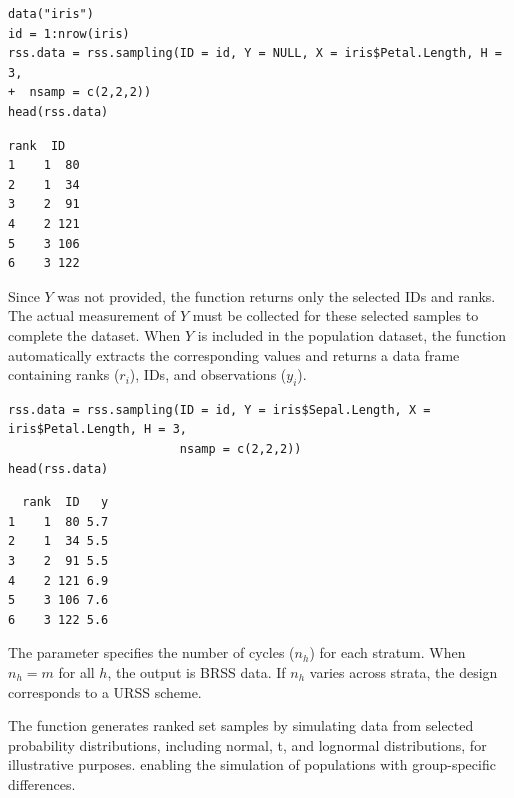 \begin{verbatim}
data("iris")
id = 1:nrow(iris)
rss.data = rss.sampling(ID = id, Y = NULL, X = iris$Petal.Length, H = 3, 
+  nsamp = c(2,2,2))
head(rss.data)
\end{verbatim}
\begin{verbatim}
rank  ID
1    1  80
2    1  34
3    2  91
4    2 121
5    3 106
6    3 122
\end{verbatim}

%
Since $Y$ was not provided, the function returns only the selected IDs and ranks. The actual measurement of $Y$ must be collected for these selected samples to complete the dataset. 
%
When $Y$ is included in the population dataset, the function automatically extracts the corresponding values and returns a data frame containing ranks ($r_i$), IDs, and observations ($y_i$).
%

\begin{verbatim}
rss.data = rss.sampling(ID = id, Y = iris$Sepal.Length, X = iris$Petal.Length, H = 3, 
                        nsamp = c(2,2,2))
head(rss.data)
\end{verbatim}
\begin{verbatim}
  rank  ID   y
1    1  80 5.7
2    1  34 5.5
3    2  91 5.5
4    2 121 6.9
5    3 106 7.6
6    3 122 5.6
\end{verbatim}
%
The  parameter specifies the number of cycles ($n_h$) for each stratum. When $n_h=m$ for all $h$, the output is BRSS data. If $n_h$ varies across strata, the design corresponds to a URSS scheme.

The function  generates ranked set samples by simulating data from selected probability distributions, including normal, t, and lognormal distributions, for illustrative purposes.  enabling the simulation of populations with group-specific differences. 

